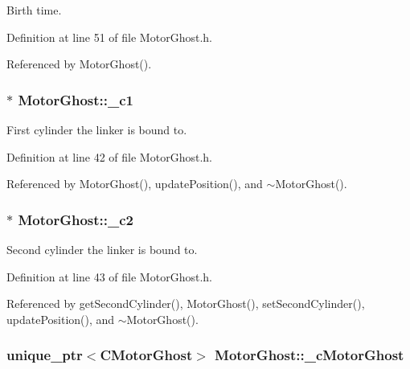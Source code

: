 Birth time. 



Definition at line 51 of file Motor\+Ghost.\+h.



Referenced by Motor\+Ghost().

\hypertarget{classMotorGhost_a0725de6b61fc0eaaa50bf0cb33f933dc}{
\subsubsection[{\+\_\+c1}]{$\ast$ Motor\+Ghost\+::\+\_\+c1\hspace{0.3cm}{\ttfamily [private]}}}\label{classMotorGhost_a0725de6b61fc0eaaa50bf0cb33f933dc}


First cylinder the linker is bound to. 



Definition at line 42 of file Motor\+Ghost.\+h.



Referenced by Motor\+Ghost(), update\+Position(), and $\sim$\+Motor\+Ghost().

\hypertarget{classMotorGhost_a0d7606f2ce76db16bb10829fd92a971b}{
\subsubsection[{\+\_\+c2}]{$\ast$ Motor\+Ghost\+::\+\_\+c2\hspace{0.3cm}{\ttfamily [private]}}}\label{classMotorGhost_a0d7606f2ce76db16bb10829fd92a971b}


Second cylinder the linker is bound to. 



Definition at line 43 of file Motor\+Ghost.\+h.



Referenced by get\+Second\+Cylinder(), Motor\+Ghost(), set\+Second\+Cylinder(), update\+Position(), and $\sim$\+Motor\+Ghost().

\hypertarget{classMotorGhost_a9e16cc127c973fe3c8e559daa5922e97}{
\subsubsection[{\+\_\+c\+Motor\+Ghost}]{\setlength{\rightskip}{0pt plus 5cm}unique\+\_\+ptr$<${\bf C\+Motor\+Ghost}$>$ Motor\+Ghost\+::\+\_\+c\+Motor\+Ghost\hspace{0.3cm}{\ttfamily [private]}}}\label{classMotorGhost_a9e16cc127c973fe3c8e559daa5922e97}



